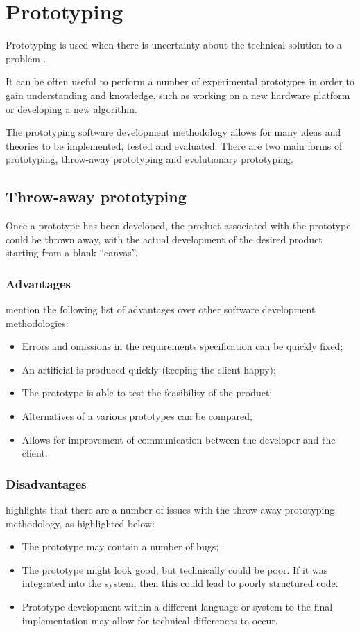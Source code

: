 \section{Prototyping}
Prototyping is used when there is uncertainty about the technical solution to 
a problem \citep{dawson09}. 

It can be often useful to perform a number of experimental prototypes in order 
to gain understanding and knowledge, such as working on a new hardware platform
or developing a new algorithm. 

The prototyping software development methodology allows for many ideas and 
theories to be implemented, tested and evaluated. There are two main forms of 
prototyping, throw-away prototyping and evolutionary prototyping.

\subsection{Throw-away prototyping}
Once a prototype has been developed, the product associated with the prototype 
could be thrown away, with the actual development of the desired product 
starting from a blank ``canvas''.

\subsubsection{Advantages}
\citet{knott_dawson99} mention the following list of advantages over other 
software development methodologies: 
\begin{itemize}
  \item Errors and omissions in the requirements specification can be quickly 
        fixed;
  \item An artificial is produced quickly (keeping the client happy);
  \item The prototype is able to test the feasibility of the product;
  \item Alternatives of a various prototypes can be compared;
  \item Allows for improvement of communication between the developer and the 
        client.
\end{itemize}

\subsubsection{Disadvantages}
\citet{dawson09} highlights that there are a number of issues with the 
throw-away prototyping methodology, as highlighted below:
\begin{itemize}
  \item The prototype may contain a number of bugs;
  \item The prototype might look good, but technically could be poor. If it was 
        integrated into the system, then this could lead to poorly structured 
        code.
  \item Prototype development within a different language or system to the 
        final implementation may allow for technical differences to occur.
\end{itemize}

